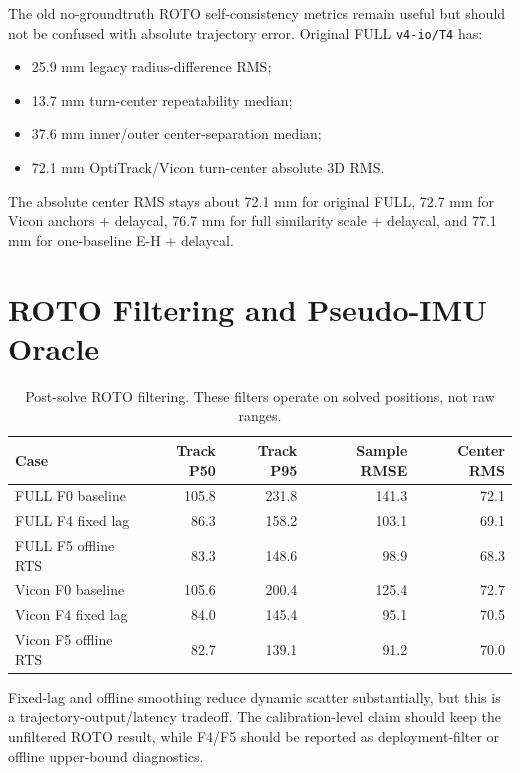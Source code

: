 \documentclass[11pt,a4paper]{article}
\newcommand{\case}[1]{\texttt{#1}}
\newcommand{\tight}{\setlength{\tabcolsep}{4pt}\renewcommand{\arraystretch}{1.12}}
\begin{document}
The old no-groundtruth ROTO self-consistency metrics remain useful but should not
be confused with absolute trajectory error.  Original FULL \case{v4-io/T4} has:
\begin{itemize}
    \item 25.9 mm legacy radius-difference RMS;
    \item 13.7 mm turn-center repeatability median;
    \item 37.6 mm inner/outer center-separation median;
    \item 72.1 mm OptiTrack/Vicon turn-center absolute 3D RMS.
\end{itemize}
The absolute center RMS stays about 72.1 mm for original FULL, 72.7 mm for Vicon
anchors + delaycal, 76.7 mm for full similarity scale + delaycal, and 77.1 mm for
one-baseline E-H + delaycal.

\section{ROTO Filtering and Pseudo-IMU Oracle}

\begin{table}[H]
\centering
\tight
\caption{Post-solve ROTO filtering.  These filters operate on solved positions,
not raw ranges.}
\begin{tabular}{lrrrr}
\toprule
Case & Track P50 & Track P95 & Sample RMSE & Center RMS \\
\midrule
FULL F0 baseline & 105.8 & 231.8 & 141.3 & 72.1 \\
FULL F4 fixed lag & 86.3 & 158.2 & 103.1 & 69.1 \\
FULL F5 offline RTS & 83.3 & 148.6 & 98.9 & 68.3 \\
Vicon F0 baseline & 105.6 & 200.4 & 125.4 & 72.7 \\
Vicon F4 fixed lag & 84.0 & 145.4 & 95.1 & 70.5 \\
Vicon F5 offline RTS & 82.7 & 139.1 & 91.2 & 70.0 \\
\bottomrule
\end{tabular}
\end{table}

Fixed-lag and offline smoothing reduce dynamic scatter substantially, but this is
a trajectory-output/latency tradeoff.  The calibration-level claim should keep the
unfiltered ROTO result, while F4/F5 should be reported as deployment-filter or
offline upper-bound diagnostics.
\end{document}
